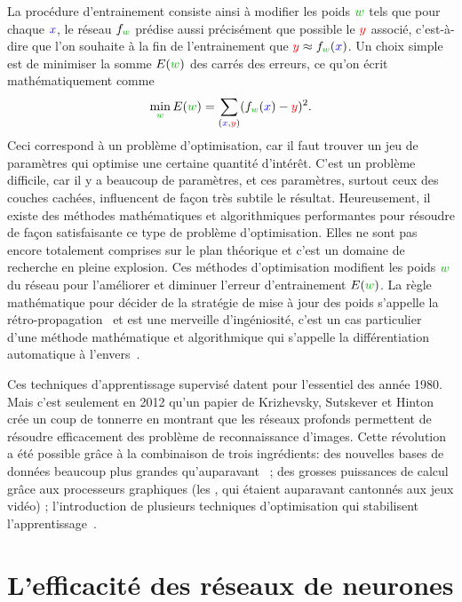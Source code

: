 La procédure d'entrainement consiste ainsi à modifier les poids $\mygreen{w}$ tels que pour chaque ${\color{blue}x}$, le réseau $f_{\mygreen{w}}$ prédise aussi précisément que possible le ${\color{red} y}$ associé, c'est-à-dire que l'on souhaite à la fin de l'entrainement que ${\color{red} y} \approx f_{\mygreen{w}}({\color{blue} x})$. 
%
Un choix simple est de minimiser la somme $E(\mygreen{w})$ des carrés des erreurs, ce qu'on écrit mathématiquement comme 
$$
	\min_{\mygreen{w}} E(\mygreen{w}) = \sum_{({\color{blue} x},{\color{red} y})} (f_{\mygreen{w}}({\color{blue} x}) - {\color{red} y})^2.
$$
%
Ceci correspond à un problème d'optimisation, car il faut trouver un jeu de paramètres qui optimise une certaine quantité d'intérêt. 
%
C'est un problème difficile, car il y a beaucoup de paramètres, et ces paramètres, surtout ceux des couches cachées, influencent de façon très subtile le résultat.
%
Heureusement, il existe des méthodes mathématiques et algorithmiques performantes pour résoudre de façon satisfaisante ce type de problème d'optimisation. Elles ne sont pas encore totalement comprises sur le plan théorique et c'est un domaine de recherche en pleine explosion.
%
Ces méthodes d'optimisation modifient les poids $\mygreen{w}$ du réseau pour l'améliorer et diminuer l'erreur d'entrainement $E(\mygreen{w})$. La règle mathématique pour décider de la stratégie de mise à jour des poids s'appelle la rétro-propagation~\cite{rumelhart1986learning} et est une merveille d'ingéniosité, c'est un cas particulier d'une méthode mathématique et algorithmique qui s'appelle la différentiation automatique à l'envers~\cite{linnainmaa1976taylor}.

Ces techniques d'apprentissage supervisé datent pour l'essentiel des année 1980. Mais c'est seulement en 2012 qu'un papier de Krizhevsky,  Sutskever et Hinton~\cite{krizhevsky2012imagenet} crée un coup de tonnerre en montrant que les réseaux profonds permettent de résoudre efficacement des problème de reconnaissance d'images. 
%
Cette révolution a été possible grâce à la combinaison de trois ingrédients: des nouvelles bases de données beaucoup plus grandes qu'auparavant~\cite{deng2009imagenet} ;  des grosses puissances de calcul grâce aux processeurs graphiques (les  , qui étaient auparavant cantonnés aux jeux vidéo) ;  l'introduction de plusieurs techniques d'optimisation qui stabilisent l'apprentissage~\cite{srivastava2014dropout}. 


\section{L'efficacité des réseaux de neurones}


